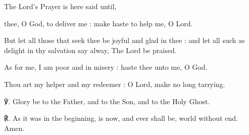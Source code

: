 \begin{rubric}
    {The Lord's Prayer is here said until,}
\end{rubric}

 thee, O God, to deliver me : make haste to help me, O Lord.\par
{}
But let all those that seek thee be joyful and glad in thee : and let all such as delight in thy salvation say alway, The Lord be praised.\par
{}As for me, I am poor and in misery : haste thee unto me, O God.\par
{}Thou art my helper and my redeemer : O Lord, make no long tarrying.\par
℣. Glory be to the Father, and to the Son, and to the Holy Ghost.\par
℟. As it was in the beginning, is now, and ever shall be, world without end. Amen.\par
